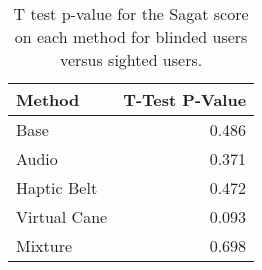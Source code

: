 
\begin{table}[!htb]
\centering
\caption{T test p-value for the Sagat score on each method for blinded users versus sighted users.}
\label{tab:ttest_sagat_score}
\begin{tabular}{lr}
\toprule
      Method &  T-Test P-Value \\
\midrule
        Base &           0.486 \\
       Audio &           0.371 \\
 Haptic Belt &           0.472 \\
Virtual Cane &           0.093 \\
     Mixture &           0.698 \\
\bottomrule
\end{tabular}
\end{table}

